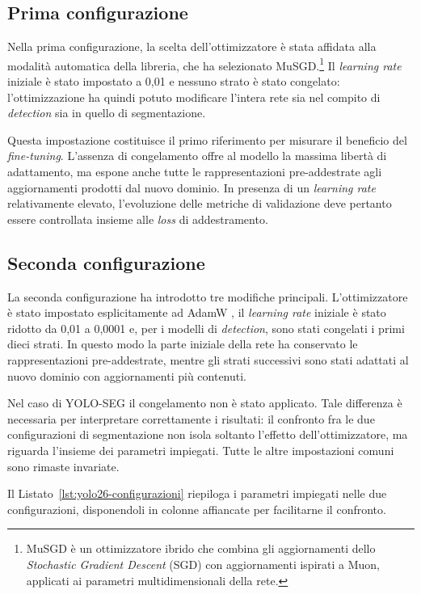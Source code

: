 \subsection{Prima configurazione}

Nella prima configurazione, la scelta dell'ottimizzatore è stata affidata alla modalità automatica della libreria, che ha selezionato MuSGD.\footnote{MuSGD è un ottimizzatore ibrido che combina gli aggiornamenti dello \textit{Stochastic Gradient Descent} (SGD) con aggiornamenti ispirati a Muon, applicati ai parametri multidimensionali della rete.} Il \textit{learning rate} iniziale è stato impostato a 0{,}01 e nessuno strato è stato congelato: l'ottimizzazione ha quindi potuto modificare l'intera rete sia nel compito di \textit{detection} sia in quello di segmentazione.

Questa impostazione costituisce il primo riferimento per misurare il beneficio del \textit{fine-tuning}. L'assenza di congelamento offre al modello la massima libertà di adattamento, ma espone anche tutte le rappresentazioni pre-addestrate agli aggiornamenti prodotti dal nuovo dominio. In presenza di un \textit{learning rate} relativamente elevato, l'evoluzione delle metriche di validazione deve pertanto essere controllata insieme alle \textit{loss} di addestramento.

\subsection{Seconda configurazione}

La seconda configurazione ha introdotto tre modifiche principali. L'ottimizzatore è stato impostato esplicitamente ad AdamW \cite{Loshchilov2019AdamW}, il \textit{learning rate} iniziale è stato ridotto da 0{,}01 a 0{,}0001 e, per i modelli di \textit{detection}, sono stati congelati i primi dieci strati. In questo modo la parte iniziale della rete ha conservato le rappresentazioni pre-addestrate, mentre gli strati successivi sono stati adattati al nuovo dominio con aggiornamenti più contenuti.

Nel caso di YOLO-SEG il congelamento non è stato applicato. Tale differenza è necessaria per interpretare correttamente i risultati: il confronto fra le due configurazioni di segmentazione non isola soltanto l'effetto dell'ottimizzatore, ma riguarda l'insieme dei parametri impiegati. Tutte le altre impostazioni comuni sono rimaste invariate.

Il Listato~\ref{lst:yolo26-configurazioni} riepiloga i parametri impiegati nelle due configurazioni, disponendoli in colonne affiancate per facilitarne il confronto.

